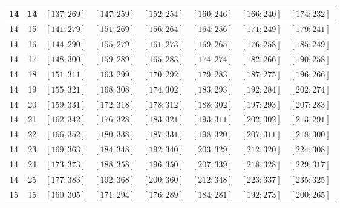 \documentclass[a4paper,12pt]{article}
\begin{document}
\begin{center}
{\begin{longtable}[H]{|c|c|c|c|c|c|c|c|}
14 &  14 &  $\left[ 137; 269\right]$ &  $\left[ 147; 259\right]$ &  $\left[ 152; 254\right]$ &  $\left[ 160; 246\right]$ &  $\left[ 166; 240\right]$ &  $\left[ 174; 232\right]$ \tabularnewline \hline
14 &  15 &  $\left[ 141; 279\right]$ &  $\left[ 151; 269\right]$ &  $\left[ 156; 264\right]$ &  $\left[ 164; 256\right]$ &  $\left[ 171; 249\right]$ &  $\left[ 179; 241\right]$ \tabularnewline \hline
14 &  16 &  $\left[ 144; 290\right]$ &  $\left[ 155; 279\right]$ &  $\left[ 161; 273\right]$ &  $\left[ 169; 265\right]$ &  $\left[ 176; 258\right]$ &  $\left[ 185; 249\right]$ \tabularnewline \hline
14 &  17 &  $\left[ 148; 300\right]$ &  $\left[ 159; 289\right]$ &  $\left[ 165; 283\right]$ &  $\left[ 174; 274\right]$ &  $\left[ 182; 266\right]$ &  $\left[ 190; 258\right]$ \tabularnewline \hline
14 &  18 &  $\left[ 151; 311\right]$ &  $\left[ 163; 299\right]$ &  $\left[ 170; 292\right]$ &  $\left[ 179; 283\right]$ &  $\left[ 187; 275\right]$ &  $\left[ 196; 266\right]$ \tabularnewline \hline
14 &  19 &  $\left[ 155; 321\right]$ &  $\left[ 168; 308\right]$ &  $\left[ 174; 302\right]$ &  $\left[ 183; 293\right]$ &  $\left[ 192; 284\right]$ &  $\left[ 202; 274\right]$ \tabularnewline \hline
14 &  20 &  $\left[ 159; 331\right]$ &  $\left[ 172; 318\right]$ &  $\left[ 178; 312\right]$ &  $\left[ 188; 302\right]$ &  $\left[ 197; 293\right]$ &  $\left[ 207; 283\right]$ \tabularnewline \hline
14 &  21 &  $\left[ 162; 342\right]$ &  $\left[ 176; 328\right]$ &  $\left[ 183; 321\right]$ &  $\left[ 193; 311\right]$ &  $\left[ 202; 302\right]$ &  $\left[ 213; 291\right]$ \tabularnewline \hline
14 &  22 &  $\left[ 166; 352\right]$ &  $\left[ 180; 338\right]$ &  $\left[ 187; 331\right]$ &  $\left[ 198; 320\right]$ &  $\left[ 207; 311\right]$ &  $\left[ 218; 300\right]$ \tabularnewline \hline
14 &  23 &  $\left[ 169; 363\right]$ &  $\left[ 184; 348\right]$ &  $\left[ 192; 340\right]$ &  $\left[ 203; 329\right]$ &  $\left[ 212; 320\right]$ &  $\left[ 224; 308\right]$ \tabularnewline \hline
14 &  24 &  $\left[ 173; 373\right]$ &  $\left[ 188; 358\right]$ &  $\left[ 196; 350\right]$ &  $\left[ 207; 339\right]$ &  $\left[ 218; 328\right]$ &  $\left[ 229; 317\right]$ \tabularnewline \hline
14 &  25 &  $\left[ 177; 383\right]$ &  $\left[ 192; 368\right]$ &  $\left[ 200; 360\right]$ &  $\left[ 212; 348\right]$ &  $\left[ 223; 337\right]$ &  $\left[ 235; 325\right]$ \tabularnewline \hline
15 &  15 &  $\left[ 160; 305\right]$ &  $\left[ 171; 294\right]$ &  $\left[ 176; 289\right]$ &  $\left[ 184; 281\right]$ &  $\left[ 192; 273\right]$ &  $\left[ 200; 265\right]$ \tabularnewline \hline

\end{longtable}}
\end{center}
\end{document}
